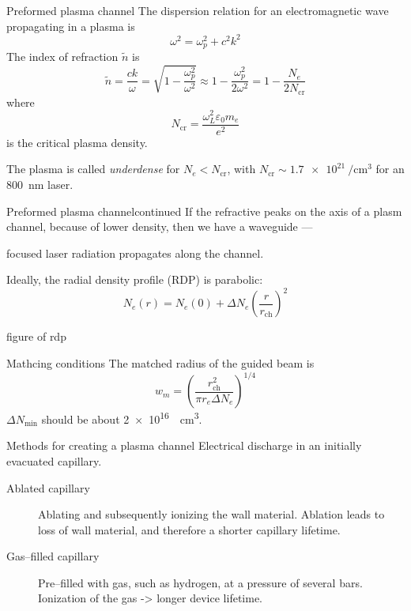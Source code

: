 \documentclass[final]{beamer}
\begin{document}
  \begin{frame}{Preformed plasma channel}
  The dispersion relation for an electromagnetic wave propagating in a plasma is
  \begin{equation}
    \omega^2=\omega_p^2+c^2k^2
  \end{equation}
  The index of refraction $\tilde n$ is
  \begin{equation}
    \tilde{n}=\frac{c k}{\omega}=\sqrt{1-\frac{\omega_p^2}{\omega^2}}\approx1-\frac{\omega_p^2}{2\omega^2}=1-\frac{N_e}{2N_\text{cr}}
  \end{equation}
  where
    \begin{equation}
        N_\text{cr}=\frac{\omega_L^2\varepsilon_0 m_e}{e^2}
    \end{equation}
    is the critical plasma density.

    The plasma is called \textit{underdense} for $N_e < N_\text{cr}$, with $N_\text{cr}\sim\SI{1.7e21}{\per\cubic\cm}$ for an \SI{800}{\nm} laser.
\end{frame}
  \begin{frame}{Preformed plasma channel}{continued}
    If the refractive peaks on the axis of a plasm channel, because of lower density, then we have a waveguide ---

    focused laser radiation propagates along the channel.

    Ideally, the radial density profile (RDP) is parabolic:
     \begin{equation*}
      N_e(r)=N_e(0)+\Delta N_e\left( \frac{r}{r_\text{ch}}\right)^2
    \end{equation*}
    \begin{center}
      figure of rdp
    \end{center}
  \end{frame}
  \begin{frame}{Mathcing conditions}
    The matched radius of the guided beam is \cite{}
   \begin{equation*}
     w_m=\left( \frac{r_\text{ch}^2}{\pi r_e \Delta N_e}\right)^{1/4}
   \end{equation*}
   $\Delta N_\text{min}$ should be about \SI{2e16}{\per \cubic \cm}.
  \end{frame}
  \begin{frame}{Methods for creating a plasma channel}
    Electrical discharge in an initially evacuated capillary.
    \begin{description}
      \item[Ablated capillary] Ablating and subsequently ionizing the wall material. Ablation leads to loss of wall material, and therefore a shorter capillary lifetime.
      \item[Gas--filled capillary] Pre--filled with gas, such as hydrogen, at a pressure of several bars. Ionization of the gas -> longer device lifetime.
    \end{description}
  \end{frame}
\end{document}
